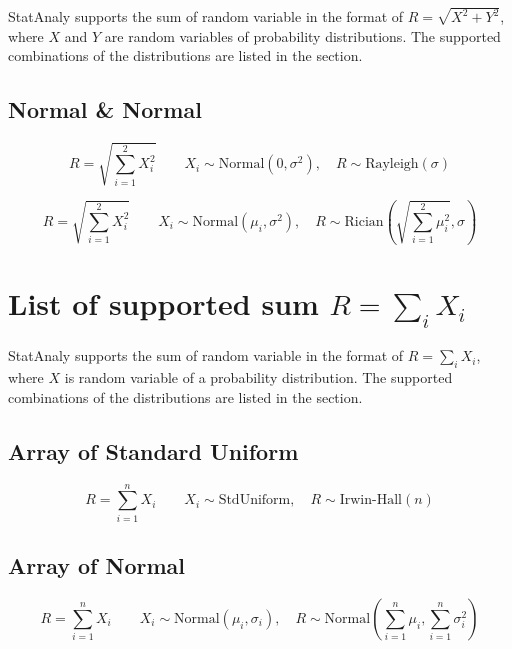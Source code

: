 StatAnaly supports the sum of random variable in the format of $R = \sqrt{X^2 + Y^2}$, where $X$ and $Y$ are random variables of probability distributions.
The supported combinations of the distributions are listed in the section.

\subsection{Normal \& Normal}

\begin{equation}
    R = \sqrt{ \sum_{i=1}^2 X_i^2 } \qquad 
    X_i \sim \text{Normal}(0,\sigma^2), \quad 
    R \sim \text{Rayleigh}\left( \sigma \right)
\end{equation}

\begin{equation}
    R = \sqrt{ \sum_{i=1}^2 X_i^2 } \qquad 
    X_i \sim \text{Normal}(\mu_i,\sigma^2), \quad 
    R \sim \text{Rician}\left(\sqrt{\sum _{i=1}^{2}\mu _{i}^2}, \sigma \right)
\end{equation}



\section{List of supported sum $R = \sum_i X_i$}

StatAnaly supports the sum of random variable in the format of $R = \sum_i X_i$, where $X$ is random variable of a probability distribution.
The supported combinations of the distributions are listed in the section.

\subsection{Array of Standard Uniform}
    \begin{equation}
        R = \sum_{i=1}^n X_i \qquad 
        X_i \sim \text{StdUniform}, \quad 
        R \sim \text{Irwin-Hall}(n)
    \end{equation}

\subsection{Array of Normal}
    \begin{equation}
        R = \sum_{i=1}^n X_i \qquad 
        X_i \sim \text{Normal}(\mu_i,\sigma_i), \quad 
        R \sim \text{Normal}\left(\sum _{i=1}^{n}\mu _{i},\sum _{i=1}^{n}\sigma _{i}^{2}\right)
    \end{equation}

